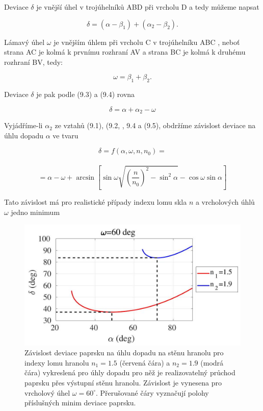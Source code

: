 \documentclass[czech,11pt,a4paper]{article}
\begin{document}
\begin{multicols}{2}
Deviace $\delta$ je vnější úhel v trojúhelníků ABD při vrcholu D a tedy můžeme napsat


\begin{equation}
	\delta=\left(\alpha-\beta_{1}\right)+\left(\alpha_{2}-\beta_{2}\right) .
\end{equation}


Lámavý úhel $\omega$ je vnějším úhlem při vrcholu C v trojúhelníku ABC , neboť strana AC je kolmá k prvnímu rozhraní AV a strana BC je kolmá k druhému rozhraní BV, tedy:


\begin{equation}
	\omega=\beta_{1}+\beta_{2} .
\end{equation}


Deviace $\delta$ je pak podle (9.3) a (9.4) rovna

\begin{equation}
	\delta=\alpha+\alpha_{2}-\omega
\end{equation}


Vyjádříme-li $\alpha_{2}$ ze vztahů (9.1), (9.2, , 9.4 a (9.5), obdržíme závislost deviace na úhlu dopadu $\alpha$ ve tvaru

{\small \begin{equation}
	\delta=f\left(\alpha, \omega, n, n_{0}\right)=\end{equation}\\\begin{equation*}
	=\alpha-\omega+\arcsin \left[\sin \omega \sqrt{\left(\frac{n}{n_{0}}\right)^{2}-\sin ^{2} \alpha}-\cos \omega \sin \alpha\right]
	\end{equation*}
}



Tato závislost má pro realistické případy indexu lomu skla $n$ a vrcholových úhlů $\omega$ jedno minimum\\
\begin{figure}[H]
	\includegraphics[max width=0.95\linewidth, center]{2024_12_03_db7ee7d12aab7219c185g-2}
	\caption{Závislost deviace paprsku na úhlu dopadu na stěnu hranolu pro indexy lomu hranolu $n_{1}=1.5$ (červená čára) a $n_{2}=1.9$ (modrá čára) vykreslená pro úhly dopadu pro něž je realizovatelný průchod paprsku přes výstupní stěnu hranolu. Závislost je vynesena pro vrcholový úhel $\omega=60^{\circ}$. Přerušované čáry vyznačují polohy příslušných minim deviace paprsku.}
\end{figure}


\end{multicols}
\end{document}
